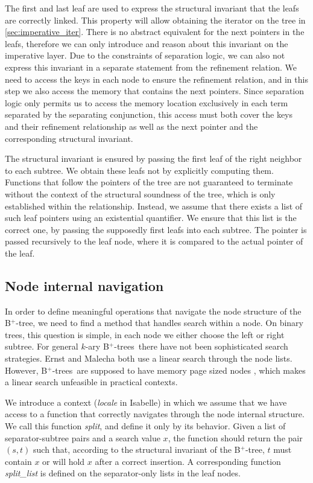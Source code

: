 \documentclass[a4paper,UKenglish,cleveref, autoref, thm-restate]{lipics-v2021}
\newcommand{\btree}{B$^+$-tree}
\newcommand{\btrees}{B$^+$-trees}
\begin{document}
The first and last leaf are used to express the structural invariant
that the leafs are correctly linked.
This property will allow obtaining the iterator on the tree in \autoref{sec:imperative_iter}.
There is no abstract equivalent for the next pointers in the leafs,
therefore we can only introduce and reason about this invariant on the imperative layer.
Due to the constraints of separation logic, we can also not express this invariant
in a separate statement from the refinement relation.
We need to access the keys in each node to ensure the refinement relation,
and in this step we also access the memory that contains the next pointers.
Since separation logic only permits us to access the memory location
exclusively in each term separated by the separating conjunction, this access 
must both cover the keys and their refinement relationship as well as the next pointer
and the corresponding structural invariant.

The structural invariant is ensured
by passing the first leaf of the right neighbor to each subtree.
We obtain these leafs not by explicitly computing them.
Functions that follow the pointers of the tree are not guaranteed
to terminate without the context of the structural soundness of the tree,
which is only established within the relationship.
Instead, we assume that there exists a list of such leaf pointers using an existential quantifier.
We ensure that this list is the correct one, by passing the supposedly
first leafs into each subtree.
The pointer is passed recursively to the leaf node,
where it is compared to the actual pointer of the leaf.

\subsection{Node internal navigation}
\label{sec:split}

In order to define meaningful operations that navigate
the node structure of the \btree,
we need to find a method that handles search within a node.
On binary trees, this question is simple, in each node we either choose
the left or right subtree.
For general $k$-ary \btrees\ there have not been sophisticated search strategies.
Ernst \cite{DBLP:journals/sosym/ErnstSR15} and Malecha \cite{DBLP:conf/popl/MalechaMSW10}
both use a linear search through the node lists.
However, \btrees\ are supposed to have memory page sized nodes \cite{DBLP:journals/csur/Comer79}, 
which makes a linear search unfeasible in practical contexts.

We introduce a context (\emph{locale} in Isabelle) in which we assume that we
have access to a function that correctly navigates through the node internal structure.
We call this function \emph{split}, and define it only by its behavior.
Given a list of separator-subtree pairs and a search value $x$, the function should return the pair $(s,t)$ such that,
according to the structural invariant of the \btree, $t$ must contain $x$ or will hold $x$ after a correct insertion.
A corresponding function \emph{split\_list} is defined on the separator-only lists in the leaf nodes.
\end{document}
